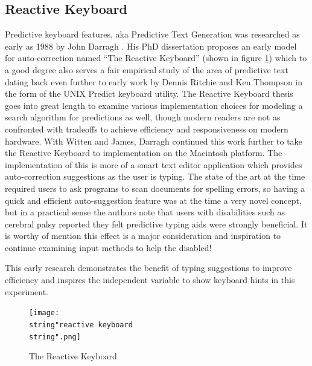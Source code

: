 \documentclass[english]{vgtc}
\begin{document}
\subsection{Reactive Keyboard}
Predictive keyboard features, aka Predictive Text Generation was researched
as early as 1988 by John Darragh \cite{darragh88}. His PhD dissertation
proposes an early model for auto-correction named \textquotedblleft The
Reactive Keyboard\textquotedblright{} (shown in figure \ref{fig:reactive_keyboard}) which to a good degree also serves a fair empirical study of the area of predictive
text dating back even further to early work by Dennis Ritchie and
Ken Thompson in the form of the UNIX Predict keyboard utility. The
Reactive Keyboard thesis goes into great length to examine various
implementation choices for modeling a search algorithm for predictions
as well, though modern readers are not as confronted with tradeoffs
to achieve efficiency and responsiveness on modern hardware. With
Witten and James, Darragh continued this work further \cite{darragh90}
to take the Reactive Keyboard to implementation on the Macintosh platform.
The implementation of this is more of a smart text editor application
which provides auto-correction suggestions as the user is typing.
The state of the art at the time required users to ask programs to
scan documents for spelling errors, so having a quick and efficient
auto-suggestion feature was at the time a very novel concept, but
in a practical sense the authors note that users with disabilities
such as cerebral palsy reported they felt predictive typing aids were
strongly beneficial. It is worthy of mention this effect is a major
consideration and inspiration to continue examining input methods
to help the disabled!

This early research demonstrates the benefit of typing suggestions to improve efficiency and inspires the independent variable to show keyboard hints in this experiment.

\begin{figure}[!htb]
  \centering
  \texttt{[image: \\string"reactive keyboard\\string".png]}
  \caption{The Reactive Keyboard \cite{darragh90}}
  \label{fig:reactive_keyboard}
\end{figure}
\end{document}
